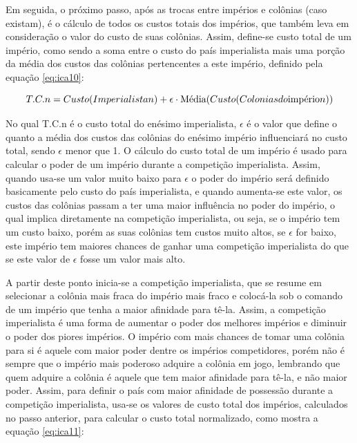 Em seguida, o próximo passo, após as trocas entre impérios e colônias (caso existam), é o cálculo de todos os custos totais dos impérios, que também leva em consideração o valor do custo de suas colônias. Assim, define-se custo total de um império, como sendo a soma entre o custo do país imperialista mais uma porção da média dos custos das colônias pertencentes a este império, definido pela equação \ref{eq:ica10}:

\begin{equation}
\label{eq:ica10}
T.C.n =   Custo(Imperialista n) + \\
 \epsilon \cdot \text{Média}(Custo(Colonias do \text{império} n))
\end{equation}

No qual T.C.n é o custo total do enésimo imperialista, \(\epsilon\)  é o valor que define o quanto a média dos custos das colônias do enésimo império influenciará no custo total, sendo \(\epsilon\) menor que 1. O cálculo do custo total de um império é usado para calcular o poder de um império durante a competição imperialista. Assim, quando usa-se um valor muito baixo para \(\epsilon\) o poder do império será definido basicamente pelo custo do país imperialista, e quando aumenta-se este valor, os custos das colônias passam a ter uma maior influência no poder do império, o qual implica diretamente na competição imperialista, ou seja, se o império tem um custo baixo, porém as suas colônias tem custos muito altos, se \(\epsilon\) for baixo, este império tem maiores chances de ganhar uma competição imperialista do que se este valor de \(\epsilon\) fosse um valor mais alto.

A partir deste ponto inicia-se a competição imperialista, que se resume em selecionar a colônia mais fraca do império mais fraco e colocá-la sob o comando de um império que tenha a maior afinidade para tê-la. Assim, a competição imperialista é uma forma de aumentar o poder dos melhores impérios e diminuir o poder dos piores impérios. O império com mais chances de tomar uma colônia para si é aquele com maior poder dentre os impérios competidores, porém não é sempre que o império mais poderoso adquire a colônia em jogo, lembrando que quem adquire a colônia é aquele que tem maior afinidade para tê-la, e não maior poder. Assim, para definir o país com maior afinidade de possessão durante a competição imperialista, usa-se os valores de custo total dos impérios, calculados no passo anterior, para calcular o custo total normalizado, como mostra a equação \ref{eq:ica11}:

